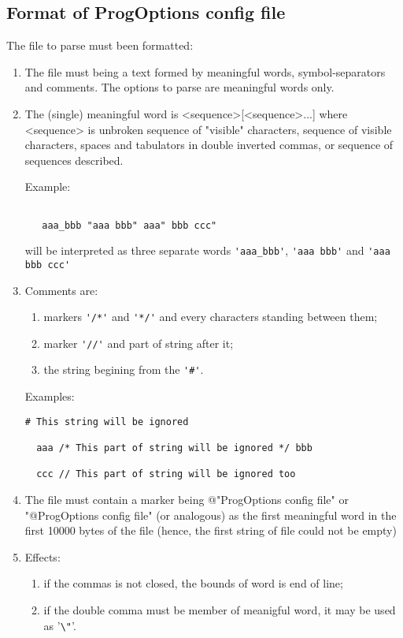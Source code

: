 \documentclass[10pt]{article}
\begin{document}
\subsection{Format of ProgOptions config file}
\label{format}

   The file to parse must been formatted: 
\begin{enumerate}
\item The file must being a text formed by meaningful words,
      symbol-separators and comments. 
      The options to parse are meaningful words only.
\item The (single) meaningful word is <sequence>[<sequence>...] 
      where <sequence> is unbroken sequence of "visible" characters,
      sequence of visible characters, spaces and tabulators in double inverted commas,
      or sequence of sequences described. 

Example:
\begin{verbatim}

   aaa_bbb "aaa bbb" aaa" bbb ccc"

\end{verbatim}
will be interpreted as three separate words \verb|'aaa_bbb'|, \verb|'aaa bbb'| and \verb|'aaa bbb ccc'|

\item Comments are:
      \begin{enumerate}
      \item markers \verb|'/*'| and \verb|'*/'| and every characters standing between them;
      \item marker \verb|'//'| and part of string after it;
      \item the string begining from the \verb|'#'|.
      \end{enumerate}

Examples:

\begin{verbatim}
# This string will be ignored

  aaa /* This part of string will be ignored */ bbb

  ccc // This part of string will be ignored too
\end{verbatim}

\item The file must contain a marker being @"ProgOptions config file" or "@ProgOptions config file"
      (or analogous) as the first meaningful word in the first 10000 bytes of the file
      (hence, the first string of file could not be empty)

\item Effects:
   \begin{enumerate}
    \item if the commas is not closed, the bounds of word is end of line;
    \item if the double comma must be member of meanigful word, it may be used as '\verb|\"|'.
   \end{enumerate}

\end{enumerate}
\end{document}
